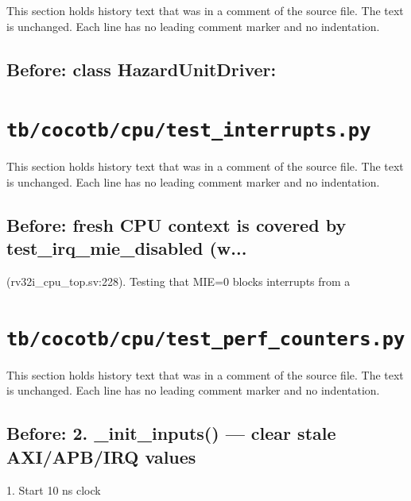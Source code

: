 This section holds history text that was in a comment of the source file. The text is unchanged. Each line has no leading comment marker and no indentation.

\begin{record}

\subsection*{Before: class HazardUnitDriver:}


\end{record}

\section{\texttt{tb/cocotb/cpu/test\_interrupts.py}}\label{cr:suite:cpu-test-interrupts}

This section holds history text that was in a comment of the source file. The text is unchanged. Each line has no leading comment marker and no indentation.

\begin{record}

\subsection*{Before: fresh CPU context is covered by test\_irq\_mie\_disabled (w...}

\begin{textblock}
(rv32i_cpu_top.sv:228).  Testing that MIE=0 blocks interrupts from a
\end{textblock}

\end{record}

\section{\texttt{tb/cocotb/cpu/test\_perf\_counters.py}}\label{cr:suite:cpu-test-perf-counters}

This section holds history text that was in a comment of the source file. The text is unchanged. Each line has no leading comment marker and no indentation.

\begin{record}

\subsection*{Before: 2. \_init\_inputs() — clear stale AXI/APB/IRQ values}

\begin{textblock}
1. Start 10 ns clock
\end{textblock}

\end{record}

